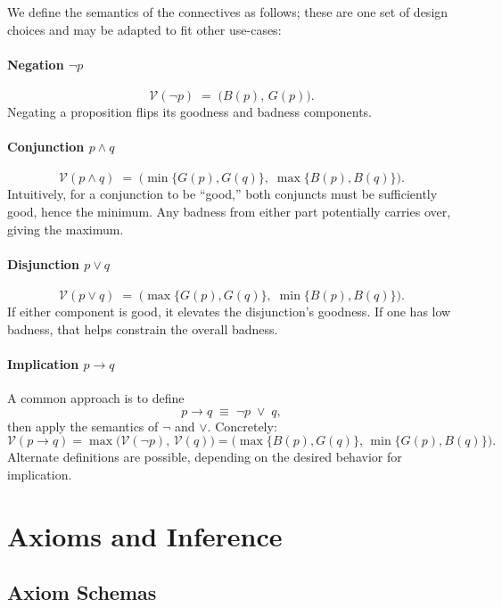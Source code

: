 \documentclass[11pt]{article}
\begin{document}
We define the semantics of the connectives as follows; these are one set of design choices and 
may be adapted to fit other use-cases:

\paragraph{Negation \(\lnot p\)}
\[
   \mathcal{V}(\lnot p) \;=\; \bigl(B(p),\,G(p)\bigr).
\]
Negating a proposition flips its goodness and badness components.

\paragraph{Conjunction \(p \land q\)}
\[
   \mathcal{V}(p \land q) \;=\;
   \bigl(\min\{G(p), G(q)\},\;\max\{B(p), B(q)\}\bigr).
\]
Intuitively, for a conjunction to be ``good,'' both conjuncts must be sufficiently good, 
hence the minimum. Any badness from either part potentially carries over, giving the maximum.

\paragraph{Disjunction \(p \lor q\)}
\[
   \mathcal{V}(p \lor q) \;=\;
   \bigl(\max\{G(p), G(q)\},\;\min\{B(p), B(q)\}\bigr).
\]
If either component is good, it elevates the disjunction's goodness. If one has low badness, 
that helps constrain the overall badness.

\paragraph{Implication \(p \to q\)}
A common approach is to define 
\[
    p \to q \;\equiv\; \lnot p \;\lor\; q,
\]
then apply the semantics of \(\lnot\) and \(\lor\). Concretely:
\[
   \mathcal{V}(p \to q) 
     = \max\bigl(\mathcal{V}(\lnot p), \,\mathcal{V}(q)\bigr)
     = \bigl(\max\{B(p), G(q)\},\,\min\{G(p), B(q)\}\bigr).
\]
Alternate definitions are possible, depending on the desired behavior for implication.

\section{Axioms and Inference}

\subsection{Axiom Schemas}
\end{document}
